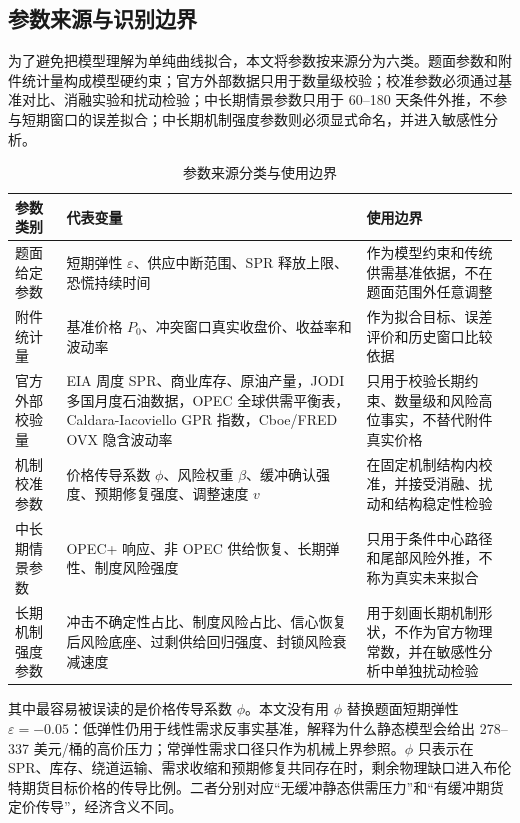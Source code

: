\subsection{参数来源与识别边界}

为了避免把模型理解为单纯曲线拟合，本文将参数按来源分为六类。题面参数和附件统计量构成模型硬约束；官方外部数据只用于数量级校验；校准参数必须通过基准对比、消融实验和扰动检验；中长期情景参数只用于 60--180 天条件外推，不参与短期窗口的误差拟合；中长期机制强度参数则必须显式命名，并进入敏感性分析。

\begin{table}[H]
\centering
\caption{参数来源分类与使用边界}
\begin{tabularx}{\linewidth}{lX X}
\toprule
参数类别 & 代表变量 & 使用边界 \\
\midrule
题面给定参数 & 短期弹性 \(\varepsilon\)、供应中断范围、SPR 释放上限、恐慌持续时间 & 作为模型约束和传统供需基准依据，不在题面范围外任意调整 \\
附件统计量 & 基准价格 \(P_0\)、冲突窗口真实收盘价、收益率和波动率 & 作为拟合目标、误差评价和历史窗口比较依据 \\
官方外部校验量 & EIA 周度 SPR、商业库存、原油产量，JODI 多国月度石油数据，OPEC 全球供需平衡表，Caldara-Iacoviello GPR 指数，Cboe/FRED OVX 隐含波动率 & 只用于校验长期约束、数量级和风险高位事实，不替代附件真实价格 \\
机制校准参数 & 价格传导系数 \(\phi\)、风险权重 \(\beta\)、缓冲确认强度、预期修复强度、调整速度 \(v\) & 在固定机制结构内校准，并接受消融、扰动和结构稳定性检验 \\
中长期情景参数 & OPEC+ 响应、非 OPEC 供给恢复、长期弹性、制度风险强度 & 只用于条件中心路径和尾部风险外推，不称为真实未来拟合 \\
长期机制强度参数 & 冲击不确定性占比、制度风险占比、信心恢复后风险底座、过剩供给回归强度、封锁风险衰减速度 & 用于刻画长期机制形状，不作为官方物理常数，并在敏感性分析中单独扰动检验 \\
\bottomrule
\end{tabularx}
\end{table}

\FloatBarrier

其中最容易被误读的是价格传导系数 \(\phi\)。本文没有用 \(\phi\) 替换题面短期弹性 \(\varepsilon=-0.05\)：低弹性仍用于线性需求反事实基准，解释为什么静态模型会给出 278--337 美元/桶的高价压力；常弹性需求口径只作为机械上界参照。\(\phi\) 只表示在 SPR、库存、绕道运输、需求收缩和预期修复共同存在时，剩余物理缺口进入布伦特期货目标价格的传导比例。二者分别对应“无缓冲静态供需压力”和“有缓冲期货定价传导”，经济含义不同。

